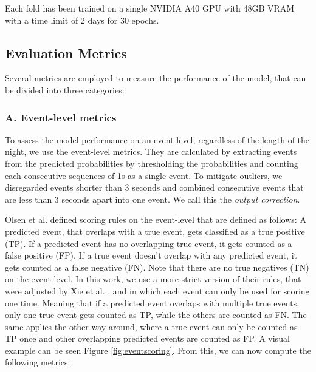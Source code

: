 Each fold has been trained on a single NVIDIA A40 GPU with 48GB VRAM with a time limit of 2 days for 30 epochs.

\subsection*{Evaluation Metrics}

Several metrics are employed to measure the performance of the model, that can be divided into three categories:

\subsubsection*{A. Event-level metrics}

To assess the model performance on an event level, regardless of the length of the night, we use the event-level metrics. They are calculated by extracting events from the predicted probabilities by thresholding the probabilities and counting each consecutive sequences of 1s as a single event. To mitigate outliers, we disregarded events shorter than 3 seconds and combined consecutive events that are less than 3 seconds apart into one event. We call this the \textit{output correction}.

Olsen et al. \cite{olsen2020robust} defined scoring rules on the event-level that are defined as follows: A predicted event, that overlaps with a true event, gets classified as a true positive (TP). If a predicted event has no overlapping true event, it gets counted as a false positive (FP). If a true event doesn't overlap with any predicted event, it gets counted as a false negative (FN). Note that there are no true negatives (TN) on the event-level. In this work, we use a more strict version of their rules, that were adjusted by Xie et al. \cite{xie2023use}, and in which each event can only be used for scoring one time. Meaning that if a predicted event overlaps with multiple true events, only one true event gets counted as TP, while the others are counted as FN. The same applies the other way around, where a true event can only be counted as TP once and other overlapping predicted events are counted as FP. A visual example can be seen Figure \ref{fig:eventscoring}. From this, we can now compute the following metrics:

